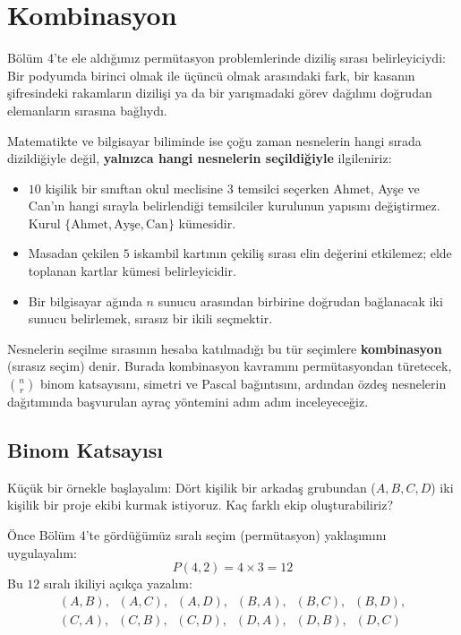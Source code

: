\chapter[Kombinasyon · \textit{Temel}]{Kombinasyon}

Bölüm 4'te ele aldığımız permütasyon problemlerinde diziliş sırası belirleyiciydi: Bir podyumda birinci olmak ile üçüncü olmak arasındaki fark, bir kasanın şifresindeki rakamların dizilişi ya da bir yarışmadaki görev dağılımı doğrudan elemanların sırasına bağlıydı. 

Matematikte ve bilgisayar biliminde ise çoğu zaman nesnelerin hangi sırada dizildiğiyle değil, \textbf{yalnızca hangi nesnelerin seçildiğiyle} ilgileniriz:
\begin{itemize}
  \item $10$ kişilik bir sınıftan okul meclisine $3$ temsilci seçerken Ahmet, Ayşe ve Can'ın hangi sırayla belirlendiği temsilciler kurulunun yapısını değiştirmez. Kurul $\{\text{Ahmet}, \text{Ayşe}, \text{Can}\}$ kümesidir.
  \item Masadan çekilen $5$ iskambil kartının çekiliş sırası elin değerini etkilemez; elde toplanan kartlar kümesi belirleyicidir.
  \item Bir bilgisayar ağında $n$ sunucu arasından birbirine doğrudan bağlanacak iki sunucu belirlemek, sırasız bir ikili seçmektir.
\end{itemize}

Nesnelerin seçilme sırasının hesaba katılmadığı bu tür seçimlere \textbf{kombinasyon} (sırasız seçim) denir. Burada kombinasyon kavramını permütasyondan türetecek, $\binom{n}{r}$ binom katsayısını, simetri ve Pascal bağıntısını, ardından özdeş nesnelerin dağıtımında başvurulan ayraç yöntemini adım adım inceleyeceğiz.

\section{Binom Katsayısı}

Küçük bir örnekle başlayalım: Dört kişilik bir arkadaş grubundan ($A, B, C, D$) iki kişilik bir proje ekibi kurmak istiyoruz. Kaç farklı ekip oluşturabiliriz?

Önce Bölüm 4'te gördüğümüz sıralı seçim (permütasyon) yaklaşımını uygulayalım:
\[ P(4, 2) = 4 \times 3 = 12 \]
Bu $12$ sıralı ikiliyi açıkça yazalım:
\begin{align*}
(A, B), \;\; (A, C), \;\; (A, D), \;\; (B, A), \;\; (B, C), \;\; (B, D), \\
(C, A), \;\; (C, B), \;\; (C, D), \;\; (D, A), \;\; (D, B), \;\; (D, C)
\end{align*}

